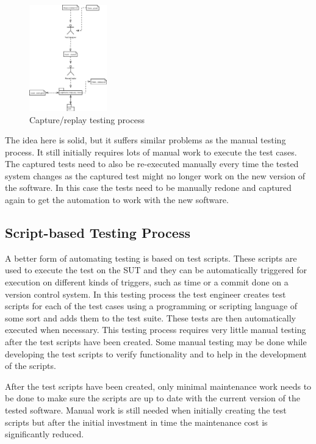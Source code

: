 \begin{figure}[ht]
	\begin{center}
		\includegraphics*[width=0.3\textwidth]{kuvat/CR_process}
	\end{center}
	\caption{Capture/replay testing process}
	\label{fig:crprocess}
\end{figure}

The idea here is solid, but it suffers similar problems as the manual testing process. It still initially requires lots of manual work to execute the test cases. The captured tests need to also be re-executed manually every time the tested system changes as the captured test might no longer work on the new version of the software. In this case the tests need to be manually redone and captured again to get the automation to work with the new software.

\subsection{Script-based Testing Process}
A better form of automating testing is based on test scripts. These scripts are used to execute the test on the SUT and they can be automatically triggered for execution on different kinds of triggers, such as time or a commit done on a version control system. In this testing process the test engineer creates test scripts for each of the test cases using a programming or scripting language of some sort and adds them to the test suite. These tests are then automatically executed when necessary. This testing process requires very little manual testing after the test scripts have been created. Some manual testing may be done while developing the test scripts to verify functionality and to help in the development of the scripts.

After the test scripts have been created, only minimal maintenance work needs to be done to make sure the scripts are up to date with the current version of the tested software. Manual work is still needed when initially creating the test scripts but after the initial investment in time the maintenance cost is significantly reduced.



